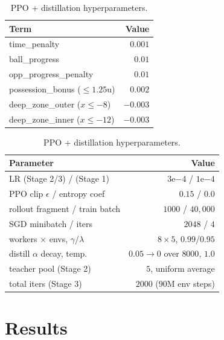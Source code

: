 \documentclass{article}
\begin{document}
\begin{table}[ht]
\centering\scriptsize
\begin{minipage}{0.40\linewidth}
\centering
\caption{v2 reward shaping (per-step).}
\label{tab:shaping}
\begin{tabular}{lr}
\toprule
Term & Value \\
\midrule
time\_penalty              & $0.001$ \\
ball\_progress             & $0.01$ \\
opp\_progress\_penalty     & $0.01$ \\
possession\_bonus ($\le 1.25$u) & $0.002$ \\
deep\_zone\_outer ($x{\le}{-}8$) & $-0.003$ \\
deep\_zone\_inner ($x{\le}{-}12$) & $-0.003$ \\
\bottomrule
\end{tabular}
\end{minipage}\hfill
\begin{minipage}{0.58\linewidth}
\centering
\caption{PPO + distillation hyperparameters.}
\label{tab:hparams}
\begin{tabular}{lr}
\toprule
Parameter & Value \\
\midrule
LR (Stage 2/3) / (Stage 1)          & $3\mathrm{e}{-4}$ / $1\mathrm{e}{-4}$ \\
PPO clip $\epsilon$ / entropy coef  & $0.15$ / $0.0$ \\
rollout fragment / train batch      & $1000$ / $40{,}000$ \\
SGD minibatch / iters               & $2048$ / $4$ \\
workers $\times$ envs, $\gamma$/$\lambda$ & $8\!\times\!5$, $0.99$/$0.95$ \\
distill $\alpha$ decay, temp.       & $0.05\!\to\!0$ over $8000$, $1.0$ \\
teacher pool (Stage 2)              & $5$, uniform average \\
total iters (Stage 3)               & $2000$ ($90$M env steps) \\
\bottomrule
\end{tabular}
\end{minipage}
\vspace{-8pt}
\end{table}

\section{Results}
\label{sec:result}
\end{document}
